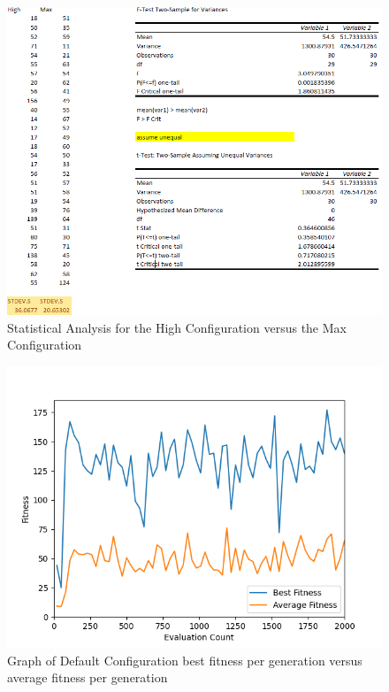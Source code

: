 \begin{figure}[H]
    \centering
    \includegraphics[width=.8\linewidth]{images/stats/high_max.png}
    \caption{Statistical Analysis for the High Configuration versus the Max Configuration}
    \label{high_max}
\end{figure}

\begin{figure}[H]
    \centering
    \includegraphics[width=.8\linewidth]{images/graphs/default_config_best_avg.png}
    \caption{Graph of Default Configuration best fitness per generation versus average fitness per generation}
    \label{default_best_avg}
\end{figure}

